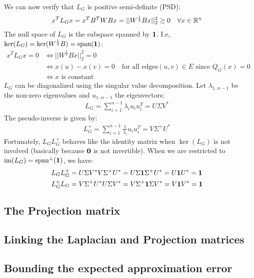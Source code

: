 \documentclass{article}
\begin{document}
We can now verify that $L_G$ is positive semi-definite (PSD):
\begin{align*}
    x^TL_Gx = x^TB^TWBx = ||W^{\frac{1}{2}}Bx||^2_2 \geq 0 \quad \forall{x
    \in \mathbb{R}^n}
\end{align*}
The null space of $L_G$ is the subspace spanned by $\mathbf{1}$. I.e, $\ker(L_G) =
\ker(W^{\frac{1}{2}}B) = \text{span}(\mathbf{1})$:
\begin{align*}
    x^TL_Gx = 0 &\Leftrightarrow ||W^{\frac{1}{2}}Bx||^2_2 = 0 \\
                &\Leftrightarrow x(u) - x(v) = 0 \quad \text{for all edges}
(u, v) \in E \text{ since } Q_G(x) = 0 \\
    &\Leftrightarrow x \text{ is constant}
\end{align*}
$L_G$ can be diagonalized using the singular value decomposition. Let
$\lambda_{1..n-1}$ be the non-zero eigenvalues and $u_{1..n-1}$ the
eigenvectors:
\begin{align*}
    L_G = \sum_{i=1}^{n-1} \lambda_iu_iu^T_i = U\Sigma V^*
\end{align*}
The pseudo-inverse is given by:
\begin{align*}
    L^+_G = \sum_{i=1}^{n-1} \frac{1}{\lambda_i}u_iu^T_i = V\Sigma^+ U^*
\end{align*}
Fortunately, $L_GL^+_G$ behaves like the identity matrix when $\ker(L_G)$ is
not involved (basically because $\mathbf{0}$ is not invertible). When we are
restricted to $\text{im}(L_G) = \text{span}^{\bot}(\mathbf{1})$, we have:
\begin{align*}
    L_GL^+_G &= U\Sigma V^*V\Sigma^+ U^*
             = U\Sigma \mathbf{1} \Sigma^+ U^*
             = U \mathbf{1} U^*
             = \mathbf{1} \\
    L^+_GL_G &= V\Sigma^+ U^*U\Sigma V^*
             = V\Sigma^+ \mathbf{1} \Sigma V^*
             = V\mathbf{1} V^*
             = \mathbf{1}
\end{align*}

\subsection{The Projection matrix}

\subsection{Linking the Laplacian and Projection matrices}

\subsection{Bounding the expected approximation error}
\end{document}
